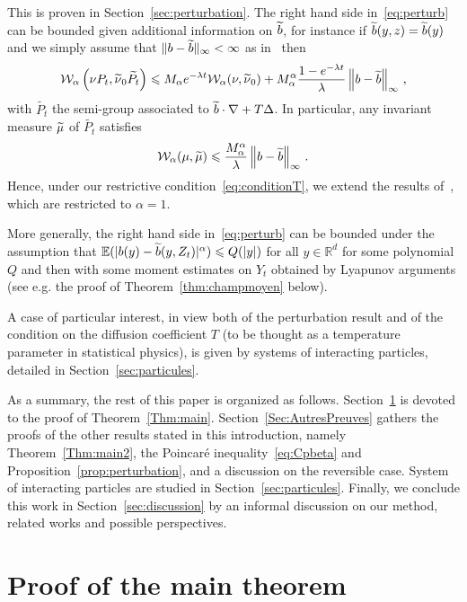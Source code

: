 \documentclass[10pt]{amsart}
\theoremstyle{definition}\newtheorem{defi}[theo]{Definition}\newtheorem{rema}[theo]{Remark}\newtheorem{exam}[theo]{Example}\newtheorem{exem}[theo]{Example}\newtheorem{nota}[theo]{Notation}
\newcommand{\R}{\mathbb R}
\newcommand{\bbE}{\mathbb E}
\newcommand{\clW}{\mathcal W}
\newcommand{\na}{\nabla}
\newcommand{\1}{\mathbbm{1}}
\newcommand{\nv}[1]{#1}
\let\oldtilde\tilde
\renewcommand*{\tilde}[1]{\mathchoice{\widetilde{#1}}{\widetilde{#1}}{\oldtilde{#1}}{\oldtilde{#1}}}
\begin{document}
This is proven in Section~\ref{sec:perturbation}. The right hand side in~\eqref{eq:perturb} can be bounded given additional information on $\tilde b$, for instance if $\tilde b(y,z)= \tilde b(y)$ and we simply assume that $\|b-\tilde b\|_\infty < \infty$ as in~\cite{DiscreteSticky,EberleZimmer} then
\[
\clW_\alpha\left(\nu P_t,\tilde \nu_0 \widetilde{P_t}\right) \leqslant M_\alpha e^{-\lambda t} \clW_\alpha(\nu,\tilde \nu_0)+ M_\alpha^\alpha \frac{1- e^{\nv{-\lambda t}}}\lambda \left\|b-\tilde b\right\|_\infty\,,
\]
with $\widetilde{P_t}$ the semi-group associated to $\tilde b\cdot\na + T\Delta$. In particular, any invariant measure $\tilde\mu$ of $\widetilde{P_t}$ satisfies
\[
\clW_\alpha(\mu,\tilde \mu) \leqslant \frac{M_\alpha^\alpha}\lambda \left\|b-\tilde b\right\|_\infty\,.
\]
Hence, under our restrictive condition~\eqref{eq:conditionT}, we extend the results of~\cite{EberleZimmer}, which are restricted to $\alpha=1$.

More generally, the right hand side in~\eqref{eq:perturb} can be bounded under the assumption that $\bbE(|b(y)-\tilde b(y,Z_t)|^\alpha) \leqslant Q(|y|)$ for all $y\in\R^d$ for some polynomial $Q$ and then with some moment estimates on $Y_t$ obtained by Lyapunov arguments (see e.g. the proof of Theorem~\ref{thm:champmoyen} below).

A case of particular interest, in view both of the perturbation result and of the condition on the diffusion coefficient $T$ (to be thought as a temperature parameter in statistical physics), is given by systems of interacting particles, detailed in Section~\ref{sec:particules}.




As a summary, the rest of this paper is organized as follows. Section~\ref{Sec:preuveThmMain} is devoted to the proof of Theorem~\ref{Thm:main}. Section~\ref{Sec:AutresPreuves} gathers the proofs of the other results stated in this introduction, namely Theorem~\ref{Thm:main2}, the Poincaré inequality~\eqref{eq:Cpbeta} and Proposition~\ref{prop:perturbation}, and a discussion on the reversible case. System of interacting particles are studied in Section~\ref{sec:particules}. Finally, we conclude this work in Section~\ref{sec:discussion} by an informal discussion on our method, related works and possible perspectives.

\section{Proof of the main theorem}\label{Sec:preuveThmMain}
\end{document}
